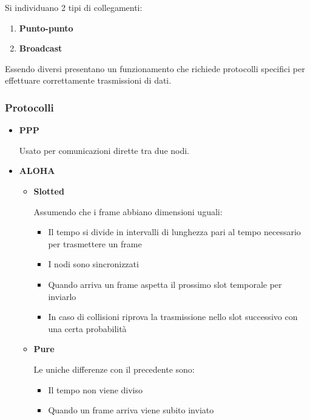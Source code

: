 \documentclass{article}
\begin{document}
\noindent Si individuano 2 tipi di collegamenti:
\begin{enumerate}
    \item \textbf{Punto-punto}
    \item \textbf{Broadcast}\newline
\end{enumerate}

\noindent Essendo diversi presentano un funzionamento che richiede protocolli specifici per effettuare correttamente trasmissioni di dati.\newline

\subsubsection{Protocolli}
\begin{itemize}
    \item \textbf{PPP}

        Usato per comunicazioni dirette tra due nodi.

    \item \textbf{ALOHA}
        \begin{itemize}
            \item \textbf{Slotted}
            
                Assumendo che i frame abbiano dimensioni uguali:
                    \begin{itemize}
                        \item Il tempo si divide in intervalli di lunghezza pari al tempo necessario per trasmettere un frame
                        \item I nodi sono sincronizzati
                        \item Quando arriva un frame aspetta il prossimo slot temporale per inviarlo
                        \item In caso di collisioni riprova la trasmissione nello slot successivo con una certa probabilità
                    \end{itemize}

            \item \textbf{Pure}

                Le uniche differenze con il precedente sono:
                    \begin{itemize}
                        \item Il tempo non viene diviso
                        \item Quando un frame arriva viene subito inviato
                    \end{itemize}


\end{itemize}
\end{itemize}
\end{document}
